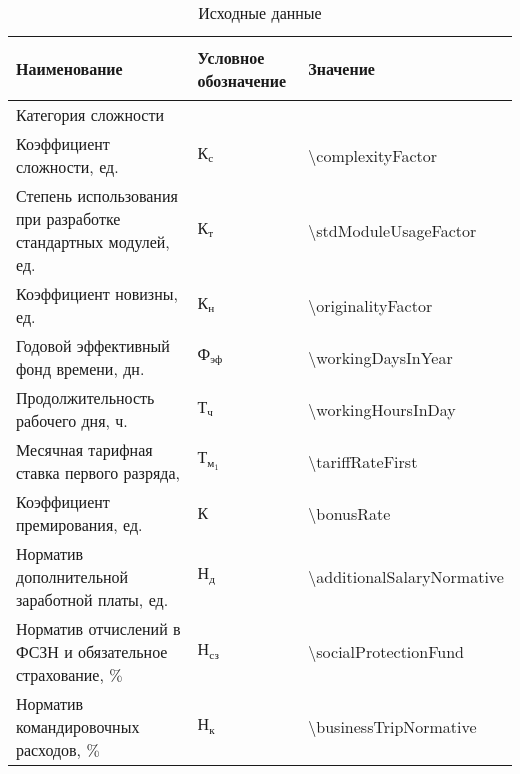 \begin{table}[!ht]
\caption{Исходные данные}
\label{table:econ:initial_data}
  \centering
  \begin{tabular}{| >{\raggedright}m{} 
                  | >{\centering}m{} 
                  | >{\centering\arraybackslash}m{}|}
    \hline
    {\begin{center}
      Наименование
    \end{center} } & Условное обозначение & Значение \\
    \hline
    Категория сложности & & 2 \\

    \hline
    Коэффициент сложности, ед. & $ \text{К}_\text{с} $ & \num{\complexityFactor} \\

    \hline
    Степень использования при разработке стандартных модулей, ед. & $ \text{К}_\text{т} $ & \num{\stdModuleUsageFactor} \\

    \hline
    Коэффициент новизны, ед. & $ \text{К}_\text{н} $ & \num{\originalityFactor} \\

    \hline
    Годовой эффективный фонд времени, дн. \cite{belcalendar_2015} & $ \text{Ф}_\text{эф} $ & \num{\workingDaysInYear} \\

    \hline
    Продолжительность рабочего дня, ч. & $ \text{Т}_\text{ч} $ & \num{\workingHoursInDay} \\

    \hline
    Месячная тарифная ставка первого разряда, \byr{} & $ \text{Т}_{\text{м}_{1}}$ & \num{\tariffRateFirst} \\

    \hline
    Коэффициент премирования, ед. & $ \text{К} $ & \num{\bonusRate} \\

    \hline
    Норматив дополнительной заработной платы, ед. & $ \text{Н}_\text{д} $ & \num{\additionalSalaryNormative} \\

    \hline
    Норматив отчислений в ФСЗН и обязательное страхование, $\%$ & $ \text{Н}_\text{сз} $ & \num{\socialProtectionFund} \\

    \hline
    Норматив командировочных расходов, $\%$ & $ \text{Н}_\text{к} $ & \num{\businessTripNormative} \\


\end{tabular}
\end{table}
